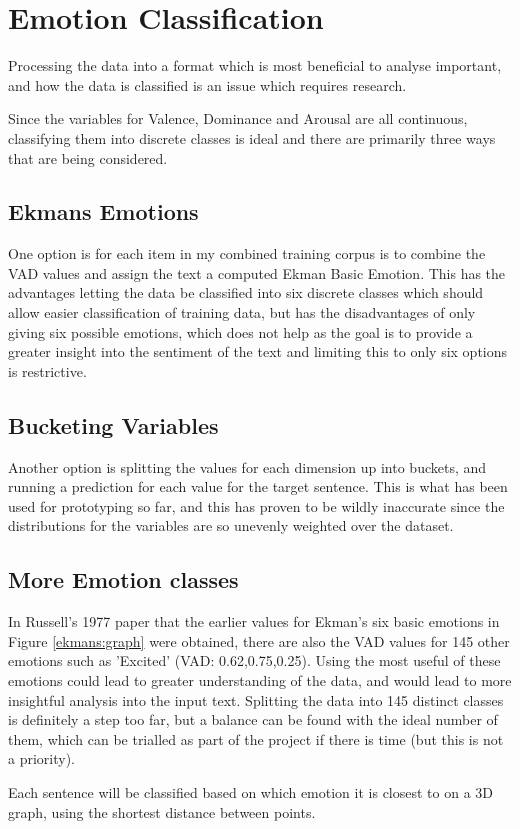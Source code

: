 \section{Emotion Classification}

Processing the data into a format which is most beneficial to analyse important, and how the data is classified is an issue which requires research.

Since the variables for Valence, Dominance and Arousal are all continuous, classifying them into discrete classes is ideal and there are primarily three ways that are being considered.

\subsection{Ekmans Emotions}
One option is for each item in my combined training corpus is to combine the VAD values and assign the text a computed Ekman Basic Emotion\cite{Ekman}. 
This has the advantages letting the data be classified into six discrete classes which should allow easier classification of training data, but has the disadvantages of only giving six possible emotions, which does not help as the goal is to provide a greater insight into the sentiment of the text and limiting this to only six options is restrictive.

\subsection{Bucketing Variables}
Another option is splitting the values for each dimension up into buckets, and running a prediction for each value for the target sentence. 
This is what has been used for prototyping so far, and this has proven to be wildly inaccurate since the distributions for the variables are so unevenly weighted over the dataset.

\subsection{More Emotion classes}
In Russell's 1977 paper \cite{VADMapping} that the earlier values for Ekman's six basic emotions in Figure \ref{ekmans:graph} were obtained, there are also the VAD values for 145 other emotions such as 'Excited' (VAD: 0.62,0.75,0.25). Using the most useful of these emotions could lead to greater understanding of the data, and would lead to more insightful analysis into the input text. Splitting the data into 145 distinct classes is definitely a step too far, but a balance can be found with the ideal number of them, which can be trialled as part of the project if there is time (but this is not a priority).

Each sentence will be classified based on which emotion it is closest to on a 3D graph, using the shortest distance between points.